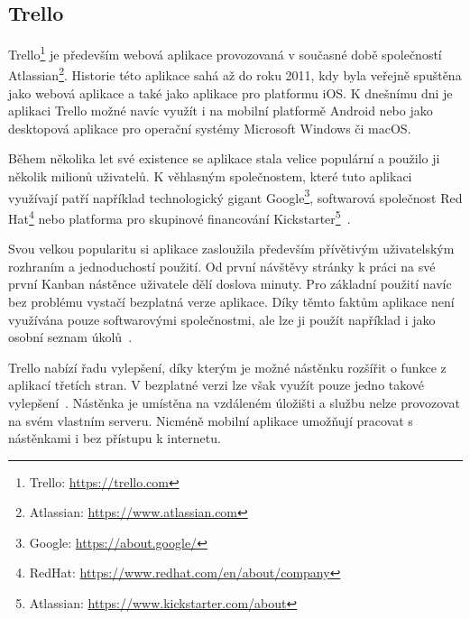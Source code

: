 \subsection{Trello}
Trello\footnote{Trello: \url{https://trello.com}} je především webová aplikace provozovaná v současné době společností Atlassian\footnote{Atlassian: \url{https://www.atlassian.com}}. Historie této aplikace sahá až do roku 2011, kdy byla veřejně spuštěna jako webová aplikace a také jako aplikace pro platformu iOS. K dnešnímu dni je aplikaci Trello možné navíc využít i na mobilní platformě Android nebo jako desktopová aplikace pro operační systémy Microsoft Windows či macOS. 

Během několika let své existence se aplikace stala velice populární a použilo ji několik milionů uživatelů. K věhlasným společnostem, které tuto aplikaci využívají patří například technologický gigant Google\footnote{Google: \url{https://about.google/}}, softwarová společnost Red Hat\footnote{RedHat: \url{https://www.redhat.com/en/about/company}} nebo platforma pro skupinové financování Kickstarter\footnote{Atlassian: \url{https://www.kickstarter.com/about}}~\cite{bib:trello-about}. 

Svou velkou popularitu si aplikace zasloužila především přívětivým uživatelským rozhraním a jednoduchostí použití. Od první návštěvy stránky k práci na své první Kanban nástěnce uživatele dělí doslova minuty. Pro základní použití navíc bez problému vystačí bezplatná verze aplikace. Díky těmto faktům aplikace není využívána pouze softwarovými společnostmi, ale lze ji použít například i jako osobní seznam úkolů~\cite{bib:jira-vs-trello}.

Trello nabízí řadu vylepšení, díky kterým je možné nástěnku rozšířit o funkce z aplikací třetích stran. 
V bezplatné verzi lze však využít pouze jedno takové vylepšení~\cite{bib:trello-pricing}.
Nástěnka je umístěna na vzdáleném úložišti a službu nelze provozovat na svém vlastním serveru. Nicméně mobilní aplikace umožňují pracovat s nástěnkami i bez přístupu k internetu.

